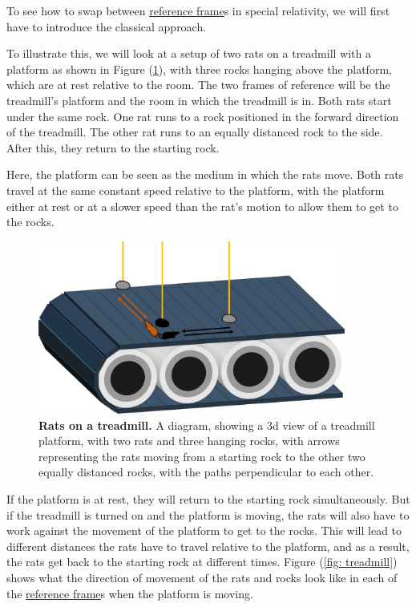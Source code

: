 To see how to swap between \hyperlink{def-Reference-frame}{reference frame}s in special relativity, we will first have to introduce the classical approach.

To illustrate this, we will look at a setup of two rats on a treadmill with a platform as shown in Figure (\ref{fig: 3d conveyor belt}), with three rocks hanging above the platform, which are at rest relative to the room.
The two frames of reference will be the treadmill's platform and the room in which the treadmill is in.
Both rats start under the same rock.
One rat runs to a rock positioned in the forward direction of the treadmill.
The other rat runs to an equally distanced rock to the side.
After this, they return to the starting rock.

Here, the platform can be seen as the medium in which the rats move.
Both rats travel at the same constant speed relative to the platform, with the platform either at rest or at a slower speed than the rat's motion to allow them to get to the rocks.

\begin{figure}[H]
	\centering
	\includegraphics[width = 0.9\textwidth]{images/pdf/Conveyor_belt_3d.pdf}
	\caption{\textbf{Rats on a treadmill.} A diagram, showing a 3d view of a treadmill platform, with two rats and three hanging rocks, with arrows representing the rats moving from a starting rock to the other two equally distanced rocks, with the paths perpendicular to each other.}
	\label{fig: 3d conveyor belt}
\end{figure}

If the platform is at rest, they will return to the starting rock simultaneously.
But if the treadmill is turned on and the platform is moving, the rats will also have to work against the movement of the platform to get to the rocks.
This will lead to different distances the rats have to travel relative to the platform, and as a result, the rats get back to the starting rock at different times.
Figure (\ref{fig: treadmill}) shows what the direction of movement of the rats and rocks look like in each of the \hyperlink{def-Reference-frame}{reference frame}s when the platform is moving.

